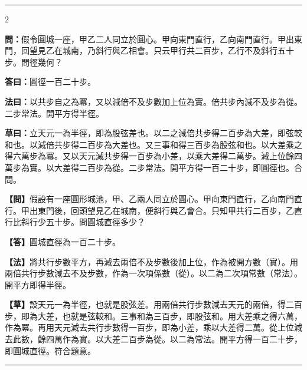 \documentclass[11pt,a4paper]{article}
\newcommand{\longline}{\noindent\rule{\textwidth}{0.4pt}}
\newcommand{\wenC}[1]{\par\noindent\textbf{\textcolor{probcolor}{問：}}{#1}\par}
\newcommand{\daC}[1]{\par\noindent\textbf{\textcolor{anscolor}{答曰：}}{#1}\par}
\newcommand{\fayueC}[1]{\par\noindent\textbf{\textcolor{methodcolor}{法曰：}}{#1}\par}
\newcommand{\caoyueC}[1]{\par\noindent\textbf{草曰：}{#1}\par}
\newcommand{\wenM}[1]{\par\noindent\textbf{\textcolor{probcolor}{【問】}}{#1}\par}
\newcommand{\daM}[1]{\par\noindent\textbf{\textcolor{anscolor}{【答】}}{#1}\par}
\newcommand{\fayueM}[1]{\par\noindent\textbf{\textcolor{methodcolor}{【法】}}{#1}\par}
\newcommand{\caoyueM}[1]{\par\noindent\textbf{【草】}{#1}\par}
\begin{document}
\vspace{0.3cm}
\longline

\begin{paracol}{2}

\wenC{假令圓城一座，甲乙二人同立於圓心。甲向東門直行，乙向南門直行。甲出東門，回望見乙在城南，乃斜行與乙相會。只云甲行共二百步，乙行不及斜行五十步。問徑幾何？}

\daC{圓徑一百二十步。}

\fayueC{以共步自之為冪，又以減倍不及步數加上位為實。倍共步內減不及步為從。二步常法。開平方得半徑。}

\caoyueC{立天元一為半徑，即為股弦差也。以二之減倍共步得二百步為大差，即弦較和也。以減倍共步得二百步為大差也。又三事和得三百步為股弦和也。以大差乘之得六萬步為冪。又以天元減共步得一百步為小差，以乘大差得二萬步。減上位餘四萬步為實。以大差得二百步為從。二步常法。開平方得一百二十步，即圓徑也。合問。}

\switchcolumn

\wenM{假設有一座圓形城池，甲、乙兩人同立於圓心。甲向東門直行，乙向南門直行。甲出東門後，回頭望見乙在城南，便斜行與乙會合。只知甲共行二百步，乙直行比斜行少五十步。問圓城直徑多少？}

\daM{圓城直徑為一百二十步。}

\fayueM{將共行步數平方，再減去兩倍不及步數後加上位，作為被開方數（實）。用兩倍共行步數減去不及步數，作為一次項係數（從）。以二為二次項常數（常法）。開平方即得半徑。}

\caoyueM{設天元一為半徑，也就是股弦差。用兩倍共行步數減去天元的兩倍，得二百步，即為大差，也就是弦較和。三事和為三百步，即股弦和。用大差乘之得六萬，作為冪。再用天元減去共行步數得一百步，即為小差，乘以大差得二萬。從上位減去此數，餘四萬作為實。以大差二百步為從。以二為常法。開平方得一百二十步，即圓城直徑。符合題意。}

\end{paracol}

\vspace{0.3cm}
\longline
\end{document}
